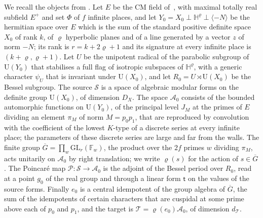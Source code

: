 \documentclass[10pt]{amsart}
\theoremstyle{definition}
\theoremstyle{remark}
\providecommand{\auAz}{\mathcal A_0}
\providecommand{\auDX}{D_X}
\providecommand{\auF}{\mathbb F}
\providecommand{\auG}{\overline G}
\providecommand{\auGL}{\mathrm{GL}}
\providecommand{\auP}{\mathcal P}
\providecommand{\auPl}{\Phi}
\providecommand{\auS}{\mathcal S}
\providecommand{\auT}{\mathcal T}
\providecommand{\auU}{\mathrm U}
\providecommand{\audT}{d_{\auT}}
\begin{document}
We recall the objects from {\cite[\S\S14.1--14.3]{P46}}. Let $E$ be the CM field
of~\cite{P46}, with maximal totally real subfield $E^+$ and set $\auPl$ of $f$ infinite places,
and let $Y_0=X_0\perp\mathbb H^{\varrho}\perp\langle-N\rangle$ be the hermitian space over $E$ which
is the sum of the standard positive definite space $X_0$ of rank $k$, of $\varrho$ hyperbolic
planes and of a line generated by a vector $z$ of norm $-N$; its rank is $r=k+2\varrho+1$ and its
signature at every infinite place is $(k+\varrho,\varrho+1)$. Let $U$ be the unipotent radical of
the parabolic subgroup of $\auU(Y_0)$ that stabilises a full flag of isotropic subspaces of
$\mathbb H^{\varrho}$, with a generic character $\psi_U$ that is invariant under $\auU(X_0)$, and
let $R_0=U\rtimes\auU(X_0)$ be the Bessel subgroup. The source $\auS$ is a space of algebraic
modular forms on the definite group $\auU(X_0)$, of dimension $\auDX$. The space $\auAz$ consists
of the bounded automorphic functions on $\auU(Y_0)$, of the principal level $J_M$ at the primes
of $E$ dividing an element $\pi_M$ of norm $M=p_0p_1$, that are reproduced by convolution with
the coefficient of the lowest $K$-type of a discrete series at every infinite place; the
parameters of these discrete series are large and far from the walls. The finite group
$\auG=\prod_w\auGL_r(\auF_w)$, the product over the $2f$ primes $w$ dividing $\pi_M$, acts
unitarily on $\auAz$ by right translation; we write $\varrho(s)$ for the action of $s\in\auG$.
The Poincar\'e map $\auP\colon\auS\to\auAz$ is the adjoint of the Bessel period over $R_0$, read
at a point $g_0$ of the real group and through a linear form $\mathsf t$ on the values of the
source forms. Finally $e_0$ is a central idempotent of the group algebra of $\auG$, the sum of
the idempotents of certain characters that are cuspidal at some prime above each of $p_0$ and
$p_1$, and the target is $\auT=\varrho(e_0)\auAz$, of dimension $\audT$.
\end{document}
